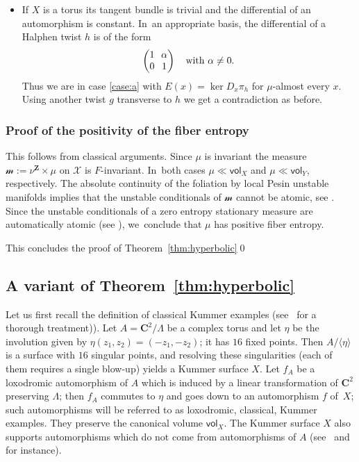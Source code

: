 \documentclass[JEP,XML,SOM,Unicode,published]{cedram}
\def\C{\mathbf{C}}
\def\Z{\mathbf{Z}}
\newcommand{\cX}{\mathcal{X}}
\newcommand{\vol}{{\mathsf{vol}}}
\newcommand{\m}{\mathscr{m}}
\theoremstyle{plain}
\theoremstyle{definition}
\begin{document}
\begin{itemize}
\item
If $X$ is a torus its tangent bundle is trivial and the differential of an automorphism is
constant. In~an appropriate basis, the differential of a Halphen twist $h$ is of the form
\begin{equation*}\arraycolsep3.5pt
\begin{pmatrix} 1 & \alpha \\ 0 & 1 \end{pmatrix} \quad\text{with } \alpha\neq 0.
\end{equation*}
Thus we are in case \eqref{case:a} with $E(x) = \ker D_x\pi_h$ for $\mu$-almost every $x$. Using another
twist $g$ transverse to $h$ we get a contradiction as before.
\end{itemize}

\subsubsection{Proof of the positivity of the fiber entropy} \label{subs:proof_positivity_entropy}
This follows from classical arguments. Since $\mu$ is invariant the measure $\m:=\nu^\Z\times \mu$ on $\cX$ is
$F$-invariant. In~both cases $\mu\ll \vol_X$ and $\mu\ll \vol_Y$, respectively.
The absolute continuity of the foliation by local Pesin unstable manifolds implies that
the unstable conditionals of $\m$ cannot be atomic, see
\eg \cite[Th.\,B, \S 3]{ledrappier-young3}.
Since the unstable conditionals of
a zero entropy stationary measure are automatically atomic (see \cite[Cor.\,7.14]{stiffness}), we~conclude that
$\mu$ has positive fiber entropy.

This concludes the proof of Theorem~\ref{thm:hyperbolic}\qed

\subsection{A variant of Theorem~\ref{thm:hyperbolic}}
Let us first recall the definition of classical Kummer examples
(see~\cite[\S 4]{finite_orbits} for a thorough treatment)).
Let $A = \C^2/\Lambda$ be a complex torus and let $\eta$ be the involution given by $\eta(z_1, z_2) = (-z_1, -z_2)$; it has $16$
fixed points. Then $A/\langle\eta\rangle$ is a
surface with $16$ singular points, and resolving these singularities (each of them requires a single blow-up)
yields a Kummer surface $X$.
Let $f_A$ be a loxodromic automorphism of $A$ which is induced by a linear transformation of $\C^2$ preserving $\Lambda$;
then $f_A$ commutes to $\eta$ and goes down to an automorphism $f$ of~$X$; such automorphisms will be referred to as
loxodromic, classical, Kummer examples. They preserve the canonical volume $\vol_X$. The Kummer surface $X$
also supports automorphisms which do not come from automorphisms of $A$ (see~\cite{Keum-Kondo} and~\cite{Dolgachev-Keum} for instance).
\end{document}
